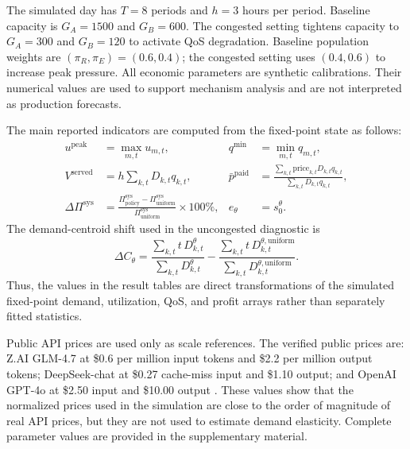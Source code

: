 \documentclass[11pt,a4paper]{article}
\newcommand{\D}{D}
\begin{document}
The simulated day has $T=8$ periods and $h=3$ hours per period. Baseline capacity is $G_A=1500$ and $G_B=600$. The congested setting tightens capacity to $G_A=300$ and $G_B=120$ to activate QoS degradation. Baseline population weights are $(\pi_R,\pi_E)=(0.6,0.4)$; the congested setting uses $(0.4,0.6)$ to increase peak pressure. All economic parameters are synthetic calibrations. Their numerical values are used to support mechanism analysis and are not interpreted as production forecasts.

The main reported indicators are computed from the fixed-point state as follows:
\begin{align}
  u^{\mathrm{peak}}
  &=\max_{m,t}u_{m,t}, &
  q^{\min}
  &=\min_{m,t}q_{m,t}, \label{eq:reported_metrics}\\
  V^{\mathrm{served}}
  &=h\sum_{k,t}\D_{k,t}q_{k,t}, &
  \bar p^{\mathrm{paid}}
  &=
  \frac{\sum_{k,t}\text{price}_{k,t}\D_{k,t}q_{k,t}}
       {\sum_{k,t}\D_{k,t}q_{k,t}}, \nonumber\\
  \Delta \Pi^{\mathrm{sys}}
  &=
  \frac{\Pi^{\mathrm{sys}}_{\mathrm{policy}}-\Pi^{\mathrm{sys}}_{\mathrm{uniform}}}
       {\Pi^{\mathrm{sys}}_{\mathrm{uniform}}}\times100\%, &
  e_\theta&=s^\theta_0 . \nonumber
\end{align}
The demand-centroid shift used in the uncongested diagnostic is
\begin{equation}
  \Delta C_\theta
  =
  \frac{\sum_{k,t}t\,\D^\theta_{k,t}}{\sum_{k,t}\D^\theta_{k,t}}
  -
  \frac{\sum_{k,t}t\,\D^{\theta,\mathrm{uniform}}_{k,t}}
       {\sum_{k,t}\D^{\theta,\mathrm{uniform}}_{k,t}} .
  \label{eq:centroid_shift}
\end{equation}
Thus, the values in the result tables are direct transformations of the simulated fixed-point demand, utilization, QoS, and profit arrays rather than separately fitted statistics.

Public API prices are used only as scale references. The verified public prices are: Z.AI GLM-4.7 at \$0.6 per million input tokens and \$2.2 per million output tokens; DeepSeek-chat at \$0.27 cache-miss input and \$1.10 output; and OpenAI GPT-4o at \$2.50 input and \$10.00 output \cite{zaiPricing2026,deepseekPricing2026,openaiGpt4oPricing2026}. These values show that the normalized prices used in the simulation are close to the order of magnitude of real API prices, but they are not used to estimate demand elasticity. Complete parameter values are provided in the supplementary material.
\end{document}
